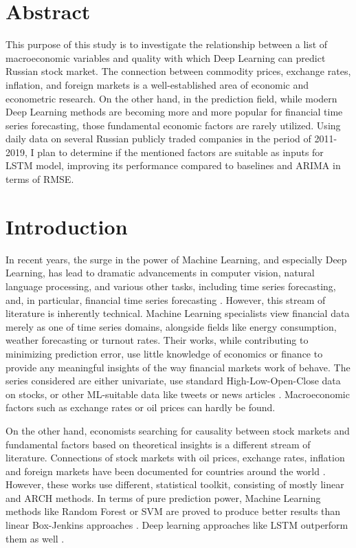 \documentclass{elsarticle}
\begin{document}
%

\tableofcontents
\clearpage

\section{Abstract}

This purpose of this study is to investigate the relationship between a list of macroeconomic variables and quality with which Deep Learning can predict Russian stock market. The connection between commodity prices, exchange rates, inflation, and foreign markets is a well-established area of economic and econometric research. On the other hand, in the prediction field, while modern Deep Learning methods are becoming more and more popular for financial time series forecasting, those fundamental economic factors are rarely utilized.
Using daily data on several Russian publicly traded companies in the period of 2011-2019, I plan to determine if the mentioned factors are suitable as inputs for LSTM model, improving its performance compared to baselines and ARIMA in terms of RMSE.

\section{Introduction}


In recent years, the surge in the power of Machine Learning, and especially Deep Learning, has lead to dramatic advancements in computer vision, natural language processing, and various other tasks, including time series forecasting, and, in particular, financial time series forecasting \citep{lara-benitez_experimental_2021}.
However, this stream of literature is inherently technical.
Machine Learning specialists view financial data merely as one of time series domains, alongside fields like energy consumption, weather forecasting or turnout rates.
Their works, while contributing to minimizing prediction error, use little knowledge of economics or finance to provide any meaningful insights of the way financial markets work of behave.
The series considered are either univariate, use standard High-Low-Open-Close data on stocks, or other ML-suitable data like tweets or news articles \citep{sezer_financial_2019}.
Macroeconomic factors such as exchange rates or oil prices can hardly be found.

On the other hand, economists searching for causality between stock markets and fundamental factors based on theoretical insights is a different stream of literature. Connections of stock markets with oil prices, exchange rates, inflation and foreign markets have been documented for countries around the world \citep{verma_impact_2021}. However, these works use different, statistical toolkit, consisting of mostly linear and ARCH methods. In terms of pure prediction power, Machine Learning methods like Random Forest or SVM are proved to produce better results than linear Box-Jenkins approaches \citep{kumar_forecasting_2006}. Deep learning approaches like LSTM outperform them as well \citep{siami-namini_forecasting_2018}.
\end{document}
